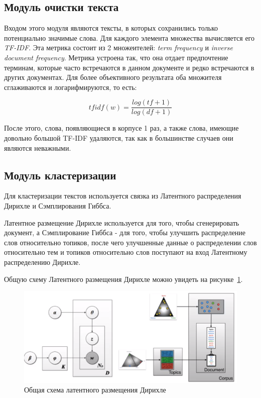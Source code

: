 \documentclass[a4paper,12pt,preview]{report} %
\begin{document}
	
	
	\subsection{Модуль очистки текста}
	
	Входом этого модуля являются тексты, в которых сохранились только потенциально значимые слова. Для каждого элемента множества вычисляется его \textit{TF-IDF}. Эта метрика состоит из 2 множеителей: \textit{term frequency} и \textit{inverse document frequency}. Метрика устроена так, что она отдает предпочтение терминам, которые часто встречаются в данном документе и редко встречаются в других документах. Для более объективного результата оба множителя сглаживаются и логарифмируются, то есть:
	
	\begin{equation}
	tfidf(w) = \dfrac{log(tf+1)}{log(df+1)}
	\end{equation}
	
	После этого, слова, появляющиеся в корпусе 1 раз, а также слова, имеющие довольно большой TF-IDF удаляются, так как в большинстве случаев они являются неважными.
	
	
	\subsection{Модуль кластеризации}
	
	Для кластеризации текстов используется связка из Латентного распределения Дирихле и Сэмплирования Гиббса. 
	
	Латентное размещение Дирихле используется для того, чтобы сгенерировать документ, а Сэмплирование Гиббса - для того, чтобы улучшить распределение слов относительно топиков, после чего улучшенные данные о распределении слов относительно тем и топиков относительно слов поступают на вход Латентному распределению Дирихле.
	
	
	Общую схему Латентного размещения Дирихле можно увидеть на рисунке~\ref{fig:derihlet_scheme}.
	
	
	\begin{figure}[H]
		\centering\includegraphics[scale=0.5]{derihlet_scheme.PNG}
		\caption{Общая схема латентного размещения Дирихле}
		\label{fig:derihlet_scheme}
	\end{figure}
	
\end{document}
